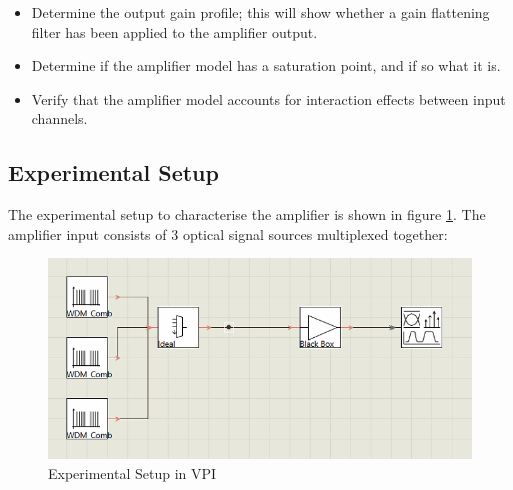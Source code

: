 \begin{itemize}    
    \item Determine the output gain profile; this will show whether a gain flattening filter has been applied to the amplifier output.\\

    \item Determine if the amplifier model has a saturation point, and if so what it is.\\
    
    \item Verify that the amplifier model accounts for interaction effects between input channels.\\
\end{itemize}





\subsection{Experimental Setup}
The experimental setup to characterise the amplifier is shown in figure \ref{fig:tw_amp_char}.
The amplifier input consists of 3 optical signal sources multiplexed together:

\begin{figure}
    \centering
    \includegraphics[width=\linewidth]{images/technical_work/section_1_characterisation/amp_char_ex_setup.png}
    \caption{Experimental Setup in VPI}
    \label{fig:tw_amp_char}
\end{figure}


